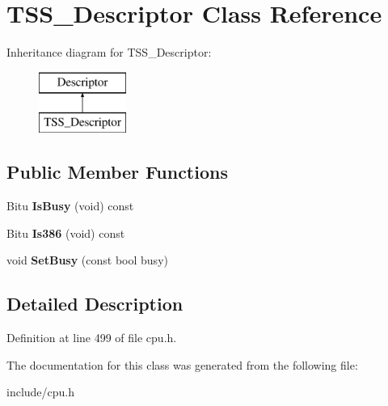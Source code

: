 \hypertarget{classTSS__Descriptor}{\section{T\-S\-S\-\_\-\-Descriptor Class Reference}
\label{classTSS__Descriptor}
}
Inheritance diagram for T\-S\-S\-\_\-\-Descriptor\-:\begin{figure}[H]
\begin{center}
\leavevmode
\includegraphics[height=2.000000cm]{classTSS__Descriptor}
\end{center}
\end{figure}
\subsection*{Public Member Functions}
\begin{DoxyCompactItemize}
\item 
\hypertarget{classTSS__Descriptor_a26dd9532a72d55eb59015058c4ee7dc2}{Bitu {\bfseries Is\-Busy} (void) const }\label{classTSS__Descriptor_a26dd9532a72d55eb59015058c4ee7dc2}

\item 
\hypertarget{classTSS__Descriptor_a3b41b696577f19ee21c4130256158ec9}{Bitu {\bfseries Is386} (void) const }\label{classTSS__Descriptor_a3b41b696577f19ee21c4130256158ec9}

\item 
\hypertarget{classTSS__Descriptor_a1fd4b23896821543c3bd7ba8ef17669f}{void {\bfseries Set\-Busy} (const bool busy)}\label{classTSS__Descriptor_a1fd4b23896821543c3bd7ba8ef17669f}

\end{DoxyCompactItemize}


\subsection{Detailed Description}


Definition at line 499 of file cpu.\-h.



The documentation for this class was generated from the following file\-:\begin{DoxyCompactItemize}
\item 
include/cpu.\-h\end{DoxyCompactItemize}
